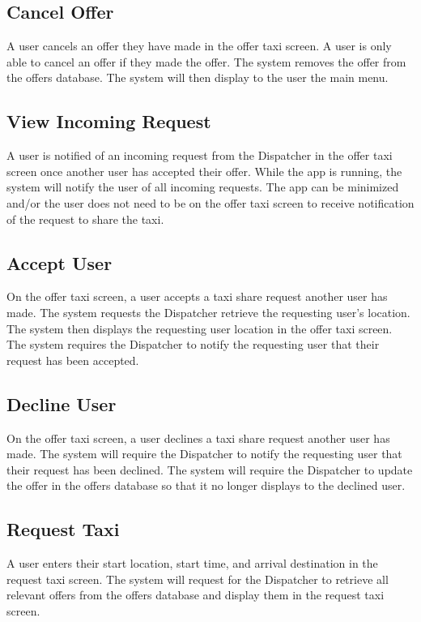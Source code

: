 \documentclass[english]{article}
\begin{document}
\subsection{Cancel Offer}
A user cancels an offer they have made in the offer taxi screen. A user is only able to cancel an offer if they made the offer. The system removes the offer from the offers database. The system will then display to the user the main menu. 
\subsection{View Incoming Request}
A user is notified of an incoming request from the Dispatcher in the offer taxi screen once another user has accepted their offer. While the app is running, the system will notify the user of all incoming requests. The app can be minimized and/or the user does not need to be on the offer taxi screen to receive notification of the request to share the taxi. 
\subsection{Accept User}
On the offer taxi screen, a user accepts a taxi share request another user has made. The system requests the Dispatcher retrieve the requesting user's location. The system then displays the requesting user location in the offer taxi screen. The system requires the Dispatcher to notify the requesting user that their request has been accepted.  
\subsection{Decline User}
On the offer taxi screen, a user declines a taxi share request another user has made. The system will require the Dispatcher to notify the requesting user that their request has been declined. The system will require the Dispatcher to update the offer in the offers database so that it no longer displays to the declined user.
\subsection{Request Taxi}
A user enters their start location, start time, and arrival destination in the request taxi screen. The system will request for the Dispatcher to retrieve all relevant offers from the offers database and display them in the request taxi screen. 
\end{document}
